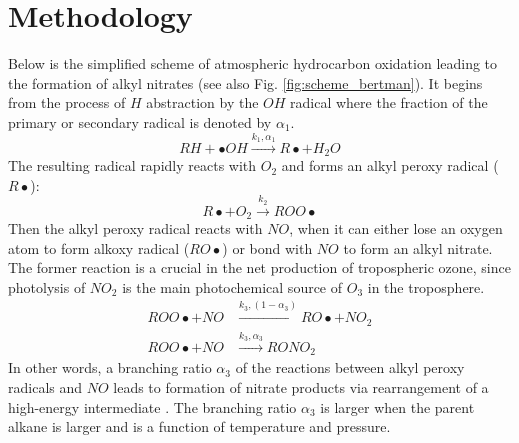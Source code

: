 \documentclass[11pt,a4paper]{article}
\begin{document}
\section{Methodology} \label{sec:method}
Below is the simplified scheme of atmospheric hydrocarbon oxidation leading to the formation of alkyl nitrates (see also Fig. \ref{fig:scheme_bertman}). It begins from the process of $H$ abstraction by the $OH$ radical where the fraction of the primary or secondary radical is denoted by $\alpha_1$.
\begin{equation} \label{eq:alkane_oh}
RH + \bullet OH \xrightarrow{k_1, \alpha_1} R\bullet + H_2O
\end{equation}
The resulting radical rapidly reacts with $O_2$ and forms an alkyl peroxy radical ($R\bullet$):
\begin{equation} \label{eq:rad_o2}
R\bullet + O_2 \xrightarrow{k_2} ROO\bullet
\end{equation}
Then the alkyl peroxy radical reacts with $NO$, when it can either lose an oxygen atom to form alkoxy radical ($RO\bullet$) or bond with $NO$ to form an alkyl nitrate. The former reaction is a crucial in the net production of tropospheric ozone, since photolysis of $NO_2$ is the main photochemical source of $O_3$ in the troposphere.
\begin{subequations} \label{eq:peroxy_no0}
\begin{align}
ROO\bullet + NO &\xrightarrow{k_3, (1-\alpha_3)} RO\bullet + NO_2 \label{eq:peroxy_no1}\\
ROO\bullet + NO &\xrightarrow{k_3, \alpha_3} RONO_2 \label{eq:peroxy_no2}
\end{align}
\end{subequations}
In other words, a branching ratio $\alpha_3$ of the reactions between alkyl peroxy radicals and $NO$ leads to formation of nitrate products via rearrangement of a high-energy intermediate \citep{Bertman1995}. The branching ratio $\alpha_3$ is larger when the parent alkane is larger and is a function of temperature and pressure.
\end{document}
